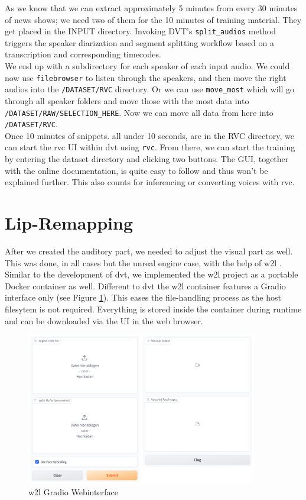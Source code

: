 \documentclass[
  a4paper,  %
  twoside,  %
  bibliography=totoc,
  headsepline,
  cleardoublepage=empty,
  parskip=half,
  draft=false
]{scrbook}
\begin{document}
As we know that we can extract approximately 5 minutes from every 30 minutes of news shows; we need two of them for the 10 minutes of training material. They get placed in the INPUT directory. Invoking DVT's \verb|split_audios| method triggers the speaker diarization and segment splitting workflow based on a transcription and corresponding timecodes. \\
We end up with a subdirectory for each speaker of each input audio. We could now use \verb|filebrowser| to listen through the speakers, and then move the right audios into the \verb|/DATASET/RVC| directory. Or we can use \verb|move_most| which will go through all speaker folders and move those with the most data into \verb|/DATASET/RAW/SELECTION_HERE|. Now we can move all data from here into \verb|/DATASET/RVC|. \\
Once 10 minutes of snippets. all under 10 seconds, are in the RVC directory, we can start the \gls{rvc} UI within \gls{dvt} using \verb|rvc|. From there, we can start the training by entering the dataset directory and clicking two buttons. The GUI, together with the online documentation, is quite easy to follow and thus won't be explained further. This also counts for inferencing or converting voices with \gls{rvc}.

\section{Lip-Remapping}
 After we created the auditory part, we needed to adjust the visual part as well. This was done, in all cases but the unreal engine case, with the help of \gls{w2l} \cite{mukhopadhyayWav2LipAccuratelyLipsyncing2023}. Similar to the development of \gls{dvt}, we implemented the \gls{w2l} project as a portable Docker container as well. Different to \gls{dvt} the \gls{w2l} container features a Gradio interface only (see Figure \ref{fig:w2l-gradio}). This eases the file-handling process as the host filesytem is not required. Everything is stored inside the container during runtime and can be downloaded via the UI in the web browser.
 \begin{figure}[h]

  \centering
  \includegraphics[width=0.9\textwidth]{./graphics/wav2lip/w2l-gradio.png}
  \caption{\gls{w2l} Gradio Webinterface}
  \label{fig:w2l-gradio}
\end{figure}
\end{document}
